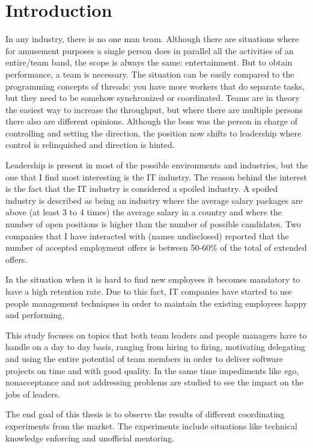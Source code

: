 \chapter{Introduction}
\label{chapter:intro}
In any industry, there is no one man team. Although there are situations where for amusement purposes a single person does in parallel all the activities of an entire/team band, the scope is always the same: entertainment. But to obtain performance, a team is necessary. The situation can be easily compared to the programming concepts of threads: you have more workers that do separate tasks, but they need to be somehow synchronized or coordinated. Teams are in theory the easiest way to increase the throughput, but where there are multiple persons there also are different opinions. Although the boss was the person in charge of controlling and setting the direction, the position now shifts to leadership where control is relinquished and direction is hinted.

Leadership is present in most of the possible environments and industries, but the one that I find most interesting is the IT industry. The reason behind the interest is the fact that the IT industry is considered a spoiled industry. A spoiled industry is described as being an industry where the average salary packages are above (at least 3 to 4 times) the average salary in a country and where the number of open positions is higher than the number of possible candidates. Two companies that I have interacted with (names undisclosed) reported that the number of accepted employment offers is between 50-60\% of the total of extended offers. 

In the situation when it is hard to find new employees it becomes mandatory to have a high retention rate. Due to this fact, IT companies have started to use people management techniques in order to maintain the existing employees happy and performing.

This study focuses on topics that both team leaders and people managers have to handle on a day to day basis, ranging from hiring to firing, motivating delegating and using the entire potential of team members in order to deliver software projects on time and with good quality. In the same time impediments like ego, nonacceptance and not addressing problems are studied to see the impact on the jobs of leaders.

The end goal of this thesis is to observe the results of different coordinating experiments from the market. The experiments include situations like technical knowledge enforcing and unofficial mentoring.

